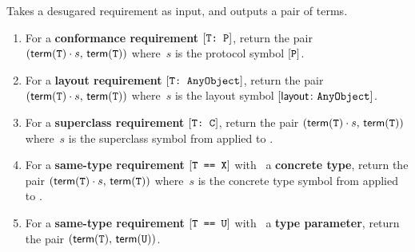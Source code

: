\documentclass[../generics]{subfiles}
\begin{document}
\begin{algorithm}\label{build rule}
Takes a desugared requirement as input, and outputs a pair of terms.
\begin{enumerate}
\item For a \textbf{conformance requirement} $[\texttt{T:~P}]$, return the pair $(\mathsf{term}(\texttt{T})\cdot s,\,\mathsf{term}(\texttt{T}))$ where~$s$ is the protocol symbol $[\texttt{P}]$.
\item For a \textbf{layout requirement} $[\texttt{T:~AnyObject}]$, return the pair $(\mathsf{term}(\texttt{T})\cdot s,\,\mathsf{term}(\texttt{T}))$ where~$s$ is the layout symbol $[\mathsf{layout}\colon\texttt{AnyObject}]$.
\item For a \textbf{superclass requirement} $[\texttt{T:~C}]$, return the pair $(\mathsf{term}(\texttt{T})\cdot s,\,\mathsf{term}(\texttt{T}))$ where~$s$ is the superclass symbol from  applied to \tC.
\item For a \textbf{same-type requirement} $[\texttt{T == X}]$ with \tX\ a \textbf{concrete type}, return the pair $(\mathsf{term}(\texttt{T})\cdot s,\,\mathsf{term}(\texttt{T}))$ where~$s$ is the concrete type symbol from  applied to \tX.
\item For a \textbf{same-type requirement} $[\texttt{T == U}]$ with \tU\ a \textbf{type parameter}, return the pair $(\mathsf{term}(\texttt{T}),\,\mathsf{term}(\texttt{U}))$.
\end{enumerate}
\end{algorithm}
\end{document}
